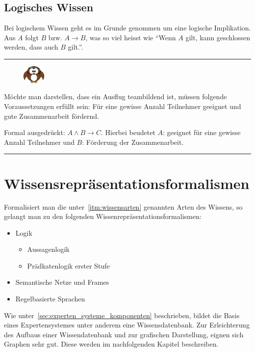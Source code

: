 \newpage

\subsection{Logisches Wissen}
\label{subsec:logisches_wissen}

Bei logischem Wissen geht es im Grunde genommen um eine logische Implikation. Aus $A$ folgt $B$ bzw. $A \to B$, was so viel heisst wie ``Wenn $A$ gilt, kann geschlossen werden, dass auch $B$ gilt.''.

\noindent\rule[1ex]{\textwidth}{1pt}
\begin{figure}
    \vspace{-14pt}
    \includegraphics[width=0.1\textwidth]{bilder/owl.png}
\end{figure}
Möchte man darstellen, dass ein Ausflug teambildend ist, müssen folgende Voraussetzungen erfüllt sein: Für eine gewisse Anzahl Teilnehmer geeignet und gute Zusammenarbeit fördernd.

Formal ausgedrückt: $A \wedge B \rightarrow C$. Hierbei beudetet $A$: geeignet für eine gewisse Anzahl Teilnehmer und $B$: Förderung der Zusammenarbeit.\\

\noindent\rule[1ex]{\textwidth}{1pt}

\section{Wissensrepräsentationsformalismen}
\label{sec:wissensrepräsentationsformalismen}

Formalisiert man die unter~\ref{itm:wissensarten} genannten Arten des Wissens, so gelangt man zu den folgenden Wissenrepräsentationsformalismen:
\begin{itemize}
    \item Logik
        \begin{itemize}
            \item Aussagenlogik
            \item Prädkatenlogik erster Stufe
        \end{itemize}
    \item Semantische Netze und Frames
    \item Regelbasierte Sprachen
\end{itemize}

Wie unter~\ref{sec:experten_systeme_komponenten} beschrieben, bildet die Basis eines Expertensystemes unter anderem eine Wissensdatenbank. Zur Erleichterung des Aufbaus einer Wissendatenbank und zur grafischen Darstellung, eignen sich Graphen sehr gut. Diese werden im nachfolgenden Kapitel beschreiben.
